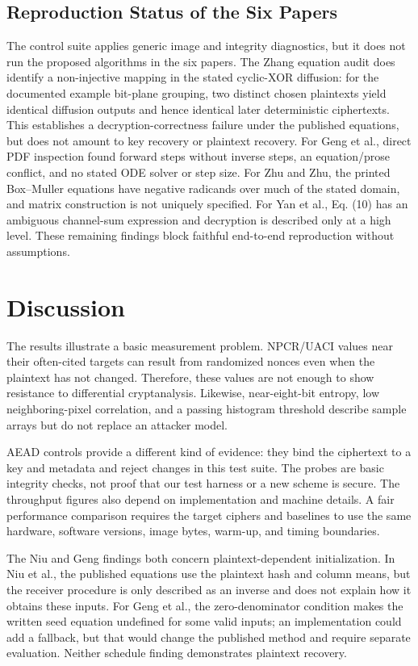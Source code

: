 \documentclass[letterpaper,journal]{IEEEtran}
\begin{document}
\subsection{Reproduction Status of the Six Papers}
The control suite applies generic image and integrity diagnostics, but it does not run the proposed algorithms in the six papers. The Zhang equation audit does identify a non-injective mapping in the stated cyclic-XOR diffusion: for the documented example bit-plane grouping, two distinct chosen plaintexts yield identical diffusion outputs and hence identical later deterministic ciphertexts. This establishes a decryption-correctness failure under the published equations, but does not amount to key recovery or plaintext recovery. For Geng et al., direct PDF inspection found forward steps without inverse steps, an equation/prose conflict, and no stated ODE solver or step size. For Zhu and Zhu, the printed Box--Muller equations have negative radicands over much of the stated domain, and matrix construction is not uniquely specified. For Yan et al., Eq. (10) has an ambiguous channel-sum expression and decryption is described only at a high level. These remaining findings block faithful end-to-end reproduction without assumptions.



\section{Discussion}
The results illustrate a basic measurement problem. NPCR/UACI values near their often-cited targets can result from randomized nonces even when the plaintext has not changed. Therefore, these values are not enough to show resistance to differential cryptanalysis. Likewise, near-eight-bit entropy, low neighboring-pixel correlation, and a passing histogram threshold describe sample arrays but do not replace an attacker model.

AEAD controls provide a different kind of evidence: they bind the ciphertext to a key and metadata and reject changes in this test suite. The probes are basic integrity checks, not proof that our test harness or a new scheme is secure. The throughput figures also depend on implementation and machine details. A fair performance comparison requires the target ciphers and baselines to use the same hardware, software versions, image bytes, warm-up, and timing boundaries.

The Niu and Geng findings both concern plaintext-dependent initialization. In Niu et al., the published equations use the plaintext hash and column means, but the receiver procedure is only described as an inverse and does not explain how it obtains these inputs. For Geng et al., the zero-denominator condition makes the written seed equation undefined for some valid inputs; an implementation could add a fallback, but that would change the published method and require separate evaluation. Neither schedule finding demonstrates plaintext recovery.
\end{document}

